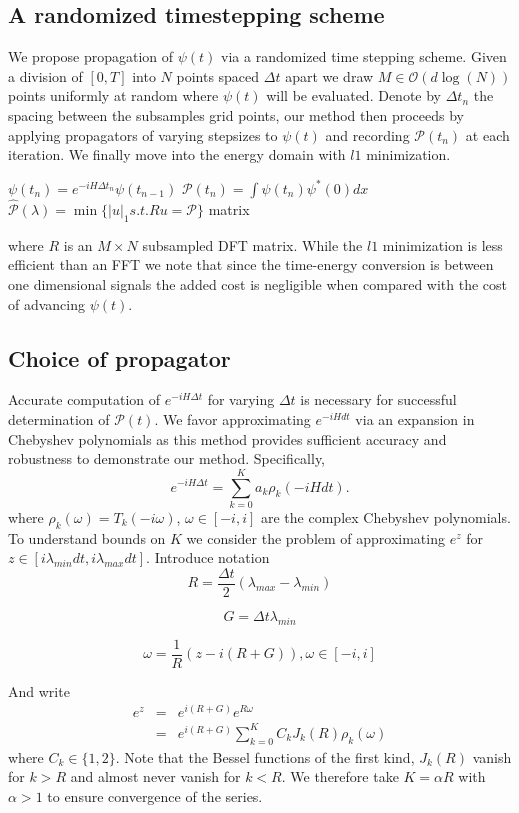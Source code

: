 \documentclass[10pt]{amsart}
\theoremstyle{remark}
\begin{document}
\subsection{ A randomized timestepping scheme}

We propose propagation of $\psi(t)$ via a randomized time stepping scheme. Given a division of $[0,T]$ into $N$ points spaced $\Delta t$ apart we draw $M \in \mathcal{O}(d \log(N))$ points uniformly at random where $\psi(t)$ will be evaluated. Denote by $\Delta t_n$ the spacing between the subsamples grid points, our method then proceeds by applying propagators of varying stepsizes to $\psi(t)$ and recording $\mathcal{P}(t_n)$ at each iteration. We finally move into the energy domain with $l1$ minimization.

\begin{algorithmic}
\STATE $\psi(t_n) = e^{-iH\Delta t_n}\psi(t_{n-1})$
\STATE $\mathcal{P}(t_n) = \int \psi(t_n)\psi^*(0) dx$
\ENDFOR
\STATE $\hat{\mathcal{P}}(\lambda) = \min \{ |u|_1 s.t. Ru = \mathcal{P} \}$
matrix\end{algorithmic}
where $R$ is an $M \times N$ subsampled DFT matrix. While the $l1$ minimization is less efficient than an FFT we note that since the time-energy conversion is between one dimensional signals the added cost is negligible when compared with the cost of advancing $\psi(t)$.




\subsection{Choice of propagator}
Accurate computation of $e^{-iH\Delta t}$ for varying $\Delta t$ is necessary for successful determination of $\mathcal{P}(t)$. We favor approximating $e^{-iHdt}$ via an expansion in Chebyshev polynomials \cite{Aviv1984} as this method provides sufficient accuracy and robustness to demonstrate our method. Specifically,
$$
e^{-iH\Delta t} = \sum_{k=0}^K a_k \rho_k (-iHdt).
$$
where $\rho_k(\omega) = T_k(-i\omega)$, $\omega \in [-i,i]$ are the complex Chebyshev polynomials. To understand bounds on $K$ we consider the problem of approximating $e^z$ for $z \in [i \lambda_{min} dt, i \lambda_{max} dt]$. Introduce notation
$$
R = \frac{\Delta t}{2}(\lambda_{max} - \lambda_{min})
$$

$$
G = \Delta t \lambda_{min}
$$

$$
\omega = \frac{1}{R}(z - i(R+G)),\omega \in [-i,i]
$$

And write
\begin{eqnarray}
e^{z} & = & e^{i(R+G)}e^{R\omega} \\
& = & e^{i(R+G)}\sum_{k=0}^K C_k J_k(R) \rho_k(\omega)
\end{eqnarray}
where $C_k \in \{1,2 \} $. Note that the Bessel functions of the first kind, $J_k(R)$ vanish for $k>R$ and almost never vanish for $k<R$. We therefore take $K= \alpha R$ with $\alpha >1$ to ensure convergence of the series.
\end{document}
